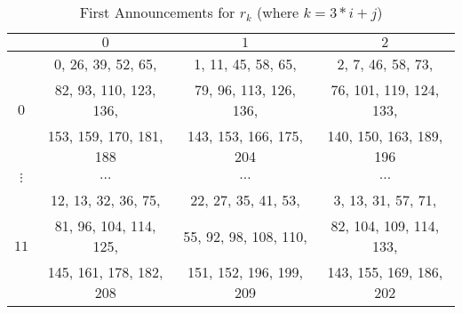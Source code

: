 \begin{table}[h]
\begin{tabular}{| c | c | c | c | }
\hline
$\;$ & $0$ & $1$ & $2$ %
\\
\hline
\multirow{3}{*}{$0$}  
& 0, 26, 39, 52, 65, 
& 1, 11, 45, 58, 65,     
& 2, 7, 46, 58, 73, 
\\ 


& 82, 93, 110, 123, 136,  
& 79, 96, 113, 126, 136, 
& 76, 101, 119, 124, 133, 
\\

& 153, 159, 170, 181, 188 
& 143, 153, 166, 175, 204
& 140, 150, 163, 189, 196
\\

\hline
\multirow{3}{*}{$\vdots$}  
& %
& %
& %
\\ 


& $\hdots $ %
& $\hdots$  %
& $\hdots $ %
\\

& %
& %
& %
\\

\hline

%
%
%

\multirow{3}{*}{$11$}  
& 12, 13, 32, 36, 75,      
& 22, 27, 35, 41, 53, 
& 3, 13, 31, 57, 71, 
\\ 

& 81, 96, 104, 114, 125, 
& 55, 92, 98, 108, 110, 
& 82, 104, 109, 114, 133, 
\\

& 145, 161, 178, 182, 208
& 151, 152, 196, 199, 209
& 143, 155, 169, 186, 202
\\

\hline

\end{tabular}
\caption{First Announcements for $r_k$ (where $k = 3*i+j$)}
\label{runsTab}
\end{table}

%
%
%
%
